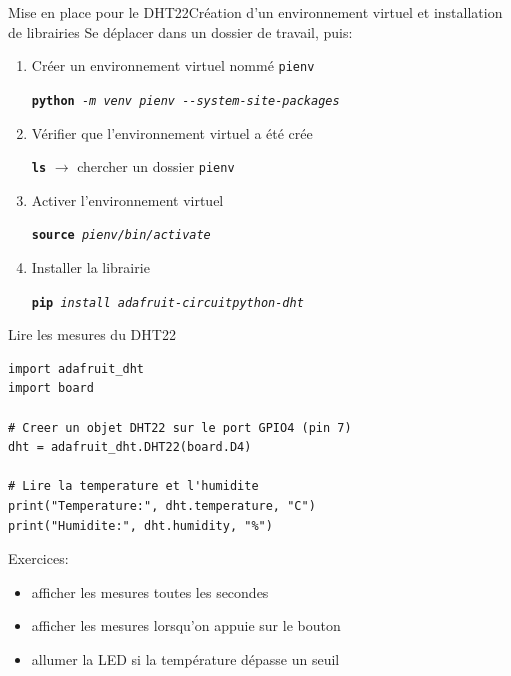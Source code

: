 \documentclass[
aspectratio=169 %
]{beamer}
\newcommand{\cmd}[1]{\texttt{\textbf{#1}}}
\newcommand{\args}[1]{\texttt{\textit{#1}}}
\begin{document}
\begin{frame}[fragile]{Mise en place pour le DHT22}{Création d'un environnement
        virtuel et installation de librairies}
    Se déplacer dans un dossier de travail, puis:
    \bigskip

    \begin{enumerate}
        \item Créer un environnement virtuel nommé \texttt{pienv}

              \cmd{python}\args{ -m venv pienv -{}-system-site-packages}
        \item Vérifier que l'environnement virtuel a été crée

              \cmd{ls} \(\rightarrow\) chercher un dossier \texttt{pienv}
        \item Activer l'environnement virtuel

              \cmd{source}\args{ pienv/bin/activate}
        \item Installer la librairie

              \cmd{pip}\args{ install adafruit-circuitpython-dht}
    \end{enumerate}
\end{frame}

\begin{frame}[fragile]{Lire les mesures du DHT22}
    \begin{lstlisting}
import adafruit_dht
import board

# Creer un objet DHT22 sur le port GPIO4 (pin 7)
dht = adafruit_dht.DHT22(board.D4)

# Lire la temperature et l'humidite
print("Temperature:", dht.temperature, "C")
print("Humidite:", dht.humidity, "%")
    \end{lstlisting}

    Exercices:
    \begin{itemize}
        \item afficher les mesures toutes les secondes
        \item afficher les mesures lorsqu'on appuie sur le bouton
        \item allumer la LED si la température dépasse un seuil
    \end{itemize}
\end{frame}
\end{document}
